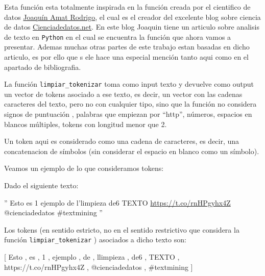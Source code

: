 \documentclass[
  11pt,
  a4paper,
]{article}
\begin{document}
Esta función esta totalmente inspirada en la función creada por el
cientifico de datos \href{}{Joaquín Amat Rodrigo}, el cual es el creador
del excelente blog sobre ciencia de datos
\href{https://www.cienciadedatos.net/}{Cienciadedatos.net}. En este blog
Joaquin tiene un articulo sobre analisis de texto en \texttt{Python} en
el cual se encuentra la función que ahora vamos a presentar. Ademas
muchas otras partes de este trabajo estan basadas en dicho articulo, es
por ello que s ele hace una especial mención tanto aqui como en el
apartado de bibliografia.

La función \texttt{limpiar\_tokenizar} toma como input texto y devuelve
como output un vector de tokens asociado a ese texto, es decir, un
vector con las cadenas caracteres del texto, pero no con cualquier tipo,
sino que la función no considera signos de puntuación , palabras que
empiezan por ``http'', números, espacios en blancos múltiples, tokens
con longitud menor que 2.

Un token aqui es considerado como una cadena de caracteres, es decir,
una concatenacion de símbolos (sin considerar el espacio en blanco como
un símbolo).

Veamos un ejemplo de lo que consideramos tokens:

Dado el siguiente texto:

'' Esto es 1 ejemplo de l'limpieza de6 TEXTO
\url{https://t.co/rnHPgyhx4Z} @cienciadedatos \#textmining ''

Los tokens (en sentido estricto, no en el sentido restrictivo que
considera la función \texttt{limpiar\_tokenizar} ) asociados a dicho
texto son:

{[} Esto , es , 1 , ejemplo , de , l\textquotesingle limpieza , de6 ,
TEXTO , https://t.co/rnHPgyhx4Z , @cienciadedatos , \#textmining {]}
\end{document}
